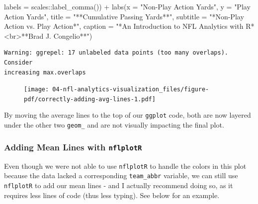 \documentclass[
  letterpaper,
]{krantz}
\newenvironment{Shaded}{\begin{snugshade}}{\end{snugshade}}
\newcommand{\AttributeTok}[1]{\textcolor[rgb]{0.40,0.45,0.13}{#1}}
\newcommand{\FunctionTok}[1]{\textcolor[rgb]{0.28,0.35,0.67}{#1}}
\newcommand{\NormalTok}[1]{\textcolor[rgb]{0.00,0.23,0.31}{#1}}
\newcommand{\SpecialCharTok}[1]{\textcolor[rgb]{0.37,0.37,0.37}{#1}}
\newcommand{\StringTok}[1]{\textcolor[rgb]{0.13,0.47,0.30}{#1}}
\begin{document}
\begin{Shaded}
\begin{Highlighting}[]
                     \AttributeTok{labels =}\NormalTok{ scales}\SpecialCharTok{::}\FunctionTok{label\_comma}\NormalTok{()) }\SpecialCharTok{+}
  \FunctionTok{labs}\NormalTok{(}\AttributeTok{x =} \StringTok{"Non{-}Play Action Yards"}\NormalTok{,}
       \AttributeTok{y =} \StringTok{"Play Action Yards"}\NormalTok{,}
       \AttributeTok{title =} \StringTok{"**Cumulative Passing Yards**"}\NormalTok{,}
       \AttributeTok{subtitle =} \StringTok{"*Non{-}Play Action vs. Play Action*"}\NormalTok{,}
       \AttributeTok{caption =} \StringTok{"*An Introduction to NFL Analytics with R*\textless{}br\textgreater{}**Brad J. Congelio**"}\NormalTok{)}
\end{Highlighting}
\end{Shaded}

\begin{verbatim}
Warning: ggrepel: 17 unlabeled data points (too many overlaps). Consider
increasing max.overlaps
\end{verbatim}

\begin{figure}[H]

{\centering \texttt{[image: 04-nfl-analytics-visualization\_files/figure-pdf/correctly-adding-avg-lines-1.pdf]}

}

\end{figure}

By moving the average lines to the top of our \texttt{ggplot} code, both
are now layered under the other two \texttt{geom\_} and are not visually
impacting the final plot.

\hypertarget{adding-mean-lines-with-nflplotr}{%
\subsubsection{\texorpdfstring{Adding Mean Lines with
\texttt{nflplotR}}{Adding Mean Lines with nflplotR}}\label{adding-mean-lines-with-nflplotr}}

\begin{tcolorbox}[enhanced jigsaw, left=2mm, toprule=.15mm, opacitybacktitle=0.6, leftrule=.75mm, bottomrule=.15mm, colbacktitle=quarto-callout-tip-color!10!white, breakable, colback=white, bottomtitle=1mm, toptitle=1mm, title=\textcolor{quarto-callout-tip-color}{\faLightbulb}\hspace{0.5em}{Tip}, coltitle=black, titlerule=0mm, arc=.35mm, opacityback=0, colframe=quarto-callout-tip-color-frame, rightrule=.15mm]

Even though we were not able to use \texttt{nflplotR} to handle the
colors in this plot because the data lacked a corresponding
\texttt{team\_abbr} variable, we can still use \texttt{nflplotR} to add
our mean lines - and I actually recommend doing so, as it requires less
lines of code (thus less typing). See below for an example.

\end{tcolorbox}
\end{document}
